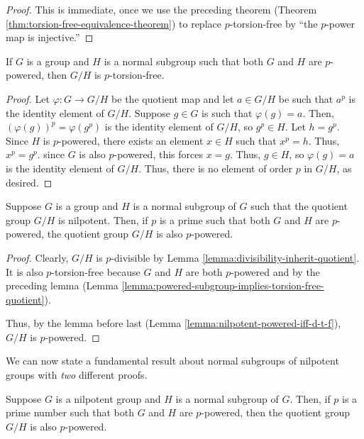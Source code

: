\begin{proof}
  This is immediate, once we use the preceding theorem (Theorem
  \ref{thm:torsion-free-equivalence-theorem}) to replace $p$-torsion-free
  by ``the $p$-power map is injective.''
\end{proof}

\begin{lemma}\label{lemma:powered-subgroup-implies-torsion-free-quotient}
  If $G$ is a group and $H$ is a normal subgroup such that both $G$
  and $H$ are $p$-powered, then $G/H$ is $p$-torsion-free.
\end{lemma}

\begin{proof}
  Let $\varphi:G \to G/H$ be the quotient map and let $a \in G/H$ be such
  that $a^p$ is the identity element of $G/H$. Suppose $g \in G$ is
  such that $\varphi(g) = a$. Then, $(\varphi(g))^p = \varphi(g^p)$ is the
  identity element of $G/H$, so $g^p \in H$. Let $h = g^p$. Since $H$
  is $p$-powered, there exists an element $x \in H$ such that $x^p =
  h$. Thus, $x^p = g^p$. since $G$ is also $p$-powered, this forces $x
  = g$. Thus, $g \in H$, so $\varphi(g) = a$ is the identity element of
  $G/H$. Thus, there is no element of order $p$ in $G/H$, as desired.
\end{proof}

\begin{theorem}\label{thm:nilpotent-quotient-piequalsqpi}
  Suppose $G$ is a group and $H$ is a normal subgroup of $G$ such that
  the quotient group $G/H$ is nilpotent. Then, if $p$ is a prime such
  that both $G$ and $H$ are $p$-powered, the quotient group $G/H$ is
  also $p$-powered.
\end{theorem}

\begin{proof}
  Clearly, $G/H$ is $p$-divisible by Lemma
  \ref{lemma:divisibility-inherit-quotient}. It is also $p$-torsion-free
  because $G$ and $H$ are both $p$-powered and by the preceding lemma
  (Lemma \ref{lemma:powered-subgroup-implies-torsion-free-quotient}).

  Thus, by the lemma before last (Lemma
  \ref{lemma:nilpotent-powered-iff-d-t-f}), $G/H$ is $p$-powered.
\end{proof}

We can now state a fundamental result about normal subgroups of
nilpotent groups with {\em two} different proofs.

\begin{theorem}\label{thm:normalsubgroupofnilpotentgroup}
  Suppose $G$ is a nilpotent group and $H$ is a normal subgroup of
  $G$. Then, if $p$ is a prime number such that both $G$ and $H$ are
  $p$-powered, then the quotient group $G/H$ is also $p$-powered.
\end{theorem}

